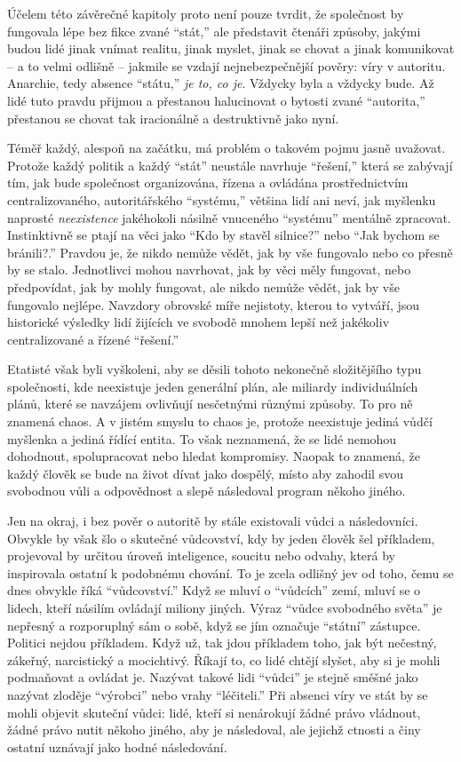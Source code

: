 \documentclass{book}
\begin{document}
Účelem této závěrečné kapitoly proto není pouze tvrdit, že společnost by fungovala lépe bez fikce zvané \enquote{stát,} ale představit čtenáři způsoby, jakými budou lidé jinak vnímat realitu, jinak myslet, jinak se chovat a jinak komunikovat -- a to velmi odlišně -- jakmile se vzdají nejnebezpečnější pověry: víry v autoritu. Anarchie, tedy absence \enquote{státu,} \emph{je to, co je}. Vždycky byla a vždycky bude. Až lidé tuto pravdu přijmou a přestanou halucinovat o bytosti zvané \enquote{autorita,} přestanou se chovat tak iracionálně a destruktivně jako nyní.

Téměř každý, alespoň na začátku, má problém o takovém pojmu jasně uvažovat. Protože každý politik a každý \enquote{stát} neustále navrhuje \enquote{řešení,} která se zabývají tím, jak bude společnost organizována, řízena a ovládána prostřednictvím centralizovaného, autoritářského \enquote{systému,} většina lidí ani neví, jak myšlenku naprosté \emph{neexistence} jakéhokoli násilně vnuceného \enquote{systému} mentálně zpracovat. Instinktivně se ptají na věci jako \enquote{Kdo by stavěl silnice?} nebo \enquote{Jak bychom se bránili?.} Pravdou je, že nikdo nemůže vědět, jak by vše fungovalo nebo co přesně by se stalo. Jednotlivci mohou navrhovat, jak by věci měly fungovat, nebo předpovídat, jak by mohly fungovat, ale nikdo nemůže vědět, jak by vše fungovalo nejlépe. Navzdory obrovské míře nejistoty, kterou to vytváří, jsou historické výsledky lidí žijících ve svobodě mnohem lepší než jakékoliv centralizované a řízené \enquote{řešení.}

Etatisté však byli vyškoleni, aby se děsili tohoto nekonečně složitějšího typu společnosti, kde neexistuje jeden generální plán, ale miliardy individuálních plánů, které se navzájem ovlivňují nesčetnými různými způsoby. To pro ně znamená chaos. A v jistém smyslu to chaos je, protože neexistuje jediná vůdčí myšlenka a jediná řídící entita. To však neznamená, že se lidé nemohou dohodnout, spolupracovat nebo hledat kompromisy. Naopak to znamená, že každý člověk se bude na život dívat jako dospělý, místo aby zahodil svou svobodnou vůli a odpovědnost a slepě následoval program někoho jiného.

Jen na okraj, i bez pověr o autoritě by stále existovali vůdci a následovníci. Obvykle by však šlo o skutečné vůdcovství, kdy by jeden člověk šel příkladem, projevoval by určitou úroveň inteligence, soucitu nebo odvahy, která by inspirovala ostatní k podobnému chování. To je zcela odlišný jev od toho, čemu se dnes obvykle říká \enquote{vůdcovství.} Když se mluví o \enquote{vůdcích} zemí, mluví se o lidech, kteří násilím ovládají miliony jiných. Výraz \enquote{vůdce svobodného světa} je nepřesný a rozporuplný sám o sobě, když se jím označuje \enquote{státní} zástupce. Politici nejdou příkladem. Když už, tak jdou příkladem toho, jak být nečestný, zákeřný, narcistický a mocichtivý. Říkají to, co lidé chtějí slyšet, aby si je mohli podmaňovat a ovládat je. Nazývat takové lidi \enquote{vůdci} je stejně směšné jako nazývat zloděje \enquote{výrobci} nebo vrahy \enquote{léčiteli.} Při absenci víry ve stát by se mohli objevit skuteční vůdci: lidé, kteří si nenárokují žádné právo vládnout, žádné právo nutit někoho jiného, aby je následoval, ale jejichž ctnosti a činy ostatní uznávají jako hodné následování.
\end{document}
